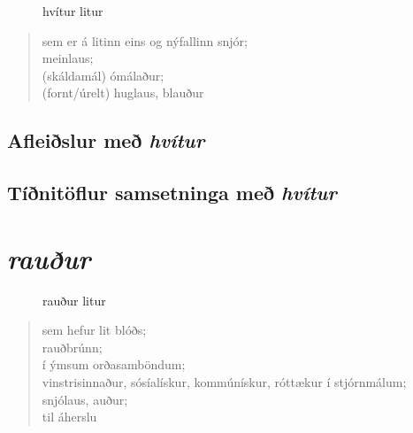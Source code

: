 \documentclass[12pt,b5paper,twosided,openright]{book}
\begin{document}
\begin{figure}[H]
\begin{tcolorbox}
	\centering
\end{tcolorbox}
	\caption{hvítur litur}
	\label{mynd:hvitt}
\end{figure}

\begin{quote}
	sem er á litinn eins og nýfallinn snjór; \\
	meinlaus; \\
	(skáldamál) ómálaður;\\
	(fornt/úrelt) huglaus, blauður \\
\end{quote}
\clearpage

\section{Afleiðslur með \textit{hvítur}}
\label{afl:hvitafl}


\section{Tíðnitöflur samsetninga með \textit{hvítur}}
\label{tidni:hvitid}


\chapter{\textit{rauður}}
\label{kafli:raudur}

\begin{figure}[H]
\begin{tcolorbox}
	\centering
\end{tcolorbox}
	\caption{rauður litur}
	\label{mynd:rautt}
\end{figure}

\begin{quote}
	sem hefur lit blóðs; \\
	rauðbrúnn; \\
	í ýmsum orðasamböndum; \\
	vinstrisinnaður, sósíalískur, kommúnískur, róttækur í stjórnmálum; \\
	snjólaus, auður; \\
	til áherslu
\end{quote}
\clearpage
\end{document}

